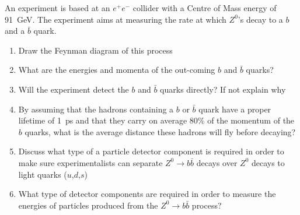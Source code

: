 An experiment is based at an $e^+e^-$ collider with a Centre of Mass energy of 91~GeV. The experiment aims at measuring the rate at which $Z^0$'s decay to a $b$ and a $\bar{b}$ quark.
\begin{enumerate}
\item Draw the Feynman diagram of this process
\item What are the energies and momenta of the out-coming $b$ and $\bar{b}$ quarks?
\item Will the experiment detect the $b$ and $\bar{b}$ quarks directly? If not explain why
\item By assuming that the hadrons containing a $b$ or $\bar{b}$ quark have a proper lifetime of 1~ps and that they carry on average 80\% of the momentum of the $b$ quarks, what is the average distance these hadrons will fly before decaying?
\item Discuss what type of a particle detector component is required in order to make sure experimentalists can separate $Z^0\to b\bar{b}$ decays over $Z^0$ decays to light quarks ($u$,$d$,$s$)
\item What type of detector components are required in order to measure the energies of particles produced from the $Z^0\to b\bar{b}$ process?
\end{enumerate}


